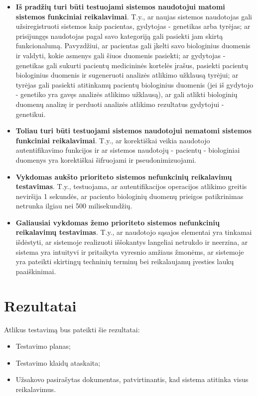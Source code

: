 \documentclass[12pt]{article}
\begin{document}
\begin{itemize}
    \item \textbf{Iš pradžių turi būti testuojami sistemos naudotojui matomi
    sistemos funkciniai reikalavimai}. T.y., ar naujas sistemos naudotojas gali
    užsiregistruoti sistemos kaip pacientas, gydytojas - genetikas arba tyrėjas;
    ar prisijungęs naudotojas pagal savo kategoriją gali pasiekti jam skirtą
    funkcionalumą. Pavyzdžiui, ar pacientas gali įkelti savo biologinius
    duomenis ir valdyti, kokie asmenys gali šiuos duomenis pasiekti; ar
    gydytojas - genetikas gali sukurti pacientų medicininės kortelės įrašus,
    pasiekti pacientų biologinius duomenis ir sugeneruoti analizės atlikimo
    užklausą tyrėjui; ar tyrėjas gali pasiekti atitinkamų pacientų biologinius
    duomenis (jei iš gydytojo -  genetiko yra gavęs analizės atlikimo užklausą),
    ar gali atlikti biologinių duomenų analizę ir perduoti analizės atlikimo
    rezultatus gydytojui - genetikui.
    \item \textbf{Toliau turi būti testuojami sistemos naudotojui nematomi
    sistemos funkciniai reikalavimai}. T.y., ar korektiškai veikia naudotojo
    autentifikavimo funkcijos ir ar sistemos naudotojų - pacientų - biologiniai
    duomenys yra korektiškai šifruojami ir pseudonimizuojami.
    \item \textbf{Vykdomas aukšto prioriteto sistemos nefunkcinių reikalavimų
    testavimas}. T.y., testuojama, ar autentifikacijos operacijos atlikimo
    greitis neviršija 1 sekundės, ar paciento biologinių duomenų prieigos
    patikrinimas netrunka ilgiau nei 500 milisekundžių.
    \item \textbf{Galiausiai vykdomas žemo prioriteto sistemos nefunkcinių
    reikalavimų testavimas}. T.y., ar naudotojo sąsajos elementai yra tinkamai
    išdėstyti, ar sistemoje realizuoti iššokantys langeliai netrukdo ir
    neerzina, ar sistema yra intuityvi ir pritaikyta vyresnio amžiaus žmonėms,
    ar sistemoje yra pateikti skirtingų techninių terminų bei reikalaujamų
    įvesties laukų paaiškinimai.
\end{itemize}

\newpage

\section{Rezultatai}
Atlikus testavimą bus pateikti šie rezultatai:
\begin{itemize}
    \item Testavimo planas;
    \item Testavimo klaidų ataskaita;
    \item Užsakovo pasirašytas dokumentas, patvirtinantis, kad sistema atitinka
    visus reikalavimus.
\end{itemize}
\end{document}

